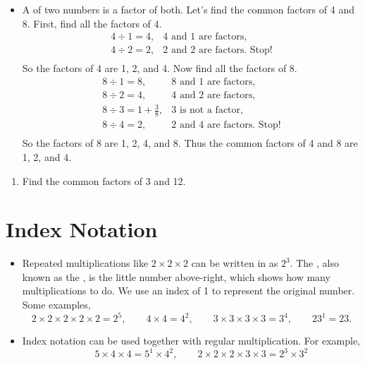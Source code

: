 \documentclass[12pt]{article}
\newcounter{exercisenum}
\newenvironment{exercises}{%
  \begin{tcolorbox}[colback=white,colframe=black,arc=0pt,breakable]
  \begin{enumerate}[label=\arabic*),leftmargin=1cm,resume=exercises]
  \setcounter{enumi}{\value{exercisenum}}
}{%
  \setcounter{exercisenum}{\value{enumi}}
  \end{enumerate}
  \end{tcolorbox}
}
\begin{document}
\begin{itemize}
\item
A  of two numbers is a factor of both. Let's find the common factors of 4 and 8. First, find all the factors of 4.
$$
\begin{array}{lc}
4 \div 1 = 4, & \text{$4$ and $1$ are factors,} \\
4 \div 2 = 2, & \text{$2$ and $2$ are factors. Stop!} \\
\end{array} 
$$
So the factors of 4 are 1, 2, and 4. Now find all the factors of 8.
$$
\begin{array}{lc}
8 \div 1 = 8, & \text{$8$ and $1$ are factors,} \\
8 \div 2 = 4, & \text{$4$ and $2$ are factors,} \\
8 \div 3 = 1+\frac{3}{8}, & \text{$3$ is not a factor,} \\
8 \div 4 = 2, & \text{$2$ and $4$ are factors. Stop!} \\
\end{array} 
$$
So the factors of 8 are 1, 2, 4, and 8. Thus the common factors of 4 and 8 are 1, 2, and 4.
\end{itemize}

\begin{exercises}
\item
Find the common factors of 3 and 12.
\end{exercises}

\section{Index Notation}

\begin{itemize}
\item
Repeated multiplications like $2\times2\times2$ can be written in  as $2^3$. The , also known as the , is the little number above-right, which shows how many multiplications to do. We use an index of 1 to represent the original number. Some examples,
$$
2\times2\times2\times2\times2 = 2^5, \quad\quad 4\times4 = 4^2, \quad\quad 3\times3\times3\times3 = 3^4, \quad\quad 23^1 = 23.
$$
\item
Index notation can be used together with regular multiplication. For example,
$$
\quad\quad 5\times4\times4 = 5^1\times 4^2,\quad\quad 2\times2\times2\times 3\times 3 = 2^3\times3^2
$$
\end{itemize}
\end{document}
